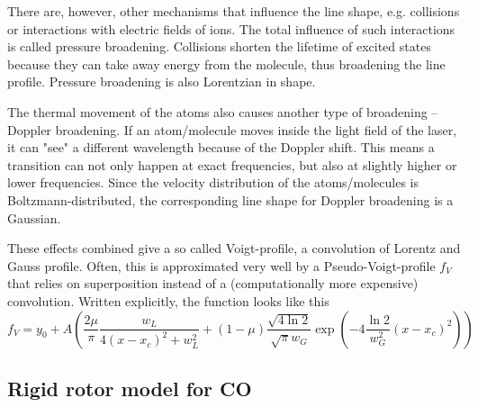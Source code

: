 \documentclass[a4paper,10pt]{scrartcl}
\begin{document}
There are, however, other mechanisms that influence the line shape, e.g. collisions or interactions with electric fields of ions. The total influence of such interactions is called pressure broadening. Collisions shorten the lifetime of excited states because they can take away energy from the molecule, thus broadening the line profile. Pressure broadening is also Lorentzian in shape.

The thermal movement of the atoms also causes another type of broadening -- Doppler broadening. If an atom/molecule moves inside the light field of the laser, it can "see" a different wavelength because of the Doppler shift. This means a transition can not only happen at exact frequencies, but also at slightly higher or lower frequencies. Since the velocity distribution of the atoms/molecules is Boltzmann-distributed, the corresponding line shape for Doppler broadening is a Gaussian.

These effects combined give a so called Voigt-profile, a convolution of Lorentz and Gauss profile. Often, this is approximated very well by a Pseudo-Voigt-profile $f_V$ that relies on superposition instead of a (computationally more expensive) convolution. Written explicitly, the function looks like this
\begin{equation}\label{eq:pseudo_voigt}
f_V = y_0 + A \left( \frac{2 \mu}{\pi} \frac{w_L}{4(x-x_c)^2 + w_L^2} + (1-\mu) \frac{\sqrt{4 \ln 2}}{\sqrt{\pi} w_G} \exp \left( -4 \frac{\ln 2}{w_G^2}(x-x_c)^2\right) \right)
\end{equation}


\subsection{Rigid rotor model for CO}
\label{subsec:rigid_rotator}
\end{document}
